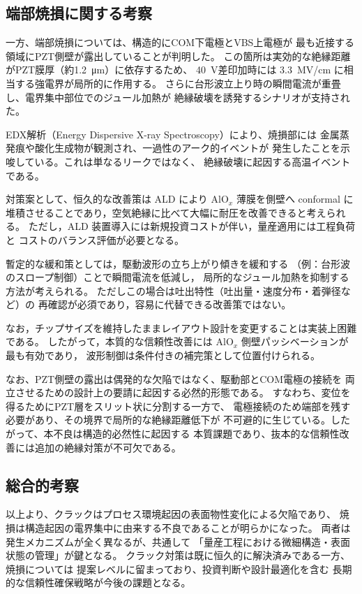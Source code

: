 \documentclass[conference]{IEEEtran}
\begin{document}
\subsection{端部焼損に関する考察}
一方、端部焼損については、構造的にCOM下電極とVBS上電極が
最も近接する領域にPZT側壁が露出していることが判明した。
この箇所は実効的な絶縁距離がPZT膜厚（約\SI{1.2}{\micro m}）に依存するため、
\SI{40}{V}差印加時には \SI{3.3}{MV/cm} に相当する強電界が局所的に作用する。
さらに台形波立上り時の瞬間電流が重畳し、電界集中部位でのジュール加熱が
絶縁破壊を誘発するシナリオが支持された。

EDX解析（Energy Dispersive X-ray Spectroscopy）により、焼損部には
金属蒸発痕や酸化生成物が観測され、一過性のアーク的イベントが
発生したことを示唆している。これは単なるリークではなく、
絶縁破壊に起因する高温イベントである。

対策案として、恒久的な改善策は ALD により AlO$_x$ 薄膜を側壁へ
conformal に堆積させることであり，空気絶縁に比べて大幅に耐圧を改善できると考えられる。
ただし，ALD 装置導入には新規投資コストが伴い，量産適用には工程負荷と
コストのバランス評価が必要となる。

暫定的な緩和策としては，駆動波形の立ち上がり傾きを緩和する
（例：台形波のスロープ制御）ことで瞬間電流を低減し，
局所的なジュール加熱を抑制する方法が考えられる。
ただしこの場合は吐出特性（吐出量・速度分布・着弾径など）の
再確認が必須であり，容易に代替できる改善策ではない。

なお，チップサイズを維持したままレイアウト設計を変更することは実装上困難である。
したがって，本質的な信頼性改善には AlO$_x$ 側壁パッシベーションが最も有効であり，
波形制御は条件付きの補完策として位置付けられる。

なお、PZT側壁の露出は偶発的な欠陥ではなく、駆動部とCOM電極の接続を
両立させるための設計上の要請に起因する必然的形態である。
すなわち、変位を得るためにPZT層をスリット状に分割する一方で、
電極接続のため端部を残す必要があり、その境界で局所的な絶縁距離低下が
不可避的に生じている。したがって、本不良は構造的必然性に起因する
本質課題であり、抜本的な信頼性改善には追加の絶縁対策が不可欠である。

\subsection{総合的考察}
以上より、クラックはプロセス環境起因の表面物性変化による欠陥であり、
焼損は構造起因の電界集中に由来する不良であることが明らかになった。
両者は発生メカニズムが全く異なるが、共通して
「量産工程における微細構造・表面状態の管理」が鍵となる。
クラック対策は既に恒久的に解決済みである一方、焼損については
提案レベルに留まっており、投資判断や設計最適化を含む
長期的な信頼性確保戦略が今後の課題となる。
\end{document}
